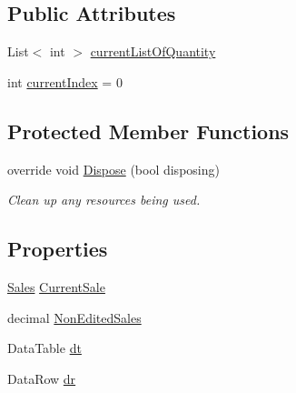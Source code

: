 \subsection*{Public Attributes}
\begin{DoxyCompactItemize}
\item 
List$<$ int $>$ \hyperlink{class_health___assignment_1_1_edit_sales_form_abeca14323d28d2e9114604dfa2dda805}{current\+List\+Of\+Quantity}
\item 
int \hyperlink{class_health___assignment_1_1_edit_sales_form_ab38d85486f4fd767389b82c1435d9b5f}{current\+Index} = 0
\end{DoxyCompactItemize}
\subsection*{Protected Member Functions}
\begin{DoxyCompactItemize}
\item 
override void \hyperlink{class_health___assignment_1_1_edit_sales_form_adad1c742c38064efe5adf0bba1f86a7f}{Dispose} (bool disposing)
\begin{DoxyCompactList}\small\item\em Clean up any resources being used. \end{DoxyCompactList}\end{DoxyCompactItemize}
\subsection*{Properties}
\begin{DoxyCompactItemize}
\item 
\hyperlink{class_health___assignment_1_1_sales}{Sales} \hyperlink{class_health___assignment_1_1_edit_sales_form_a3271578e2ccca070f81797ce8ff85bce}{Current\+Sale}
\item 
decimal \hyperlink{class_health___assignment_1_1_edit_sales_form_aa2c0d62907099190231db3249172e42f}{Non\+Edited\+Sales}
\item 
Data\+Table \hyperlink{class_health___assignment_1_1_edit_sales_form_a2ee6a832fbe48dae3ef0494a8f58557b}{dt}
\item 
Data\+Row \hyperlink{class_health___assignment_1_1_edit_sales_form_a304986aedb20a02b1b080086b7e9c4a3}{dr}
\end{DoxyCompactItemize}


